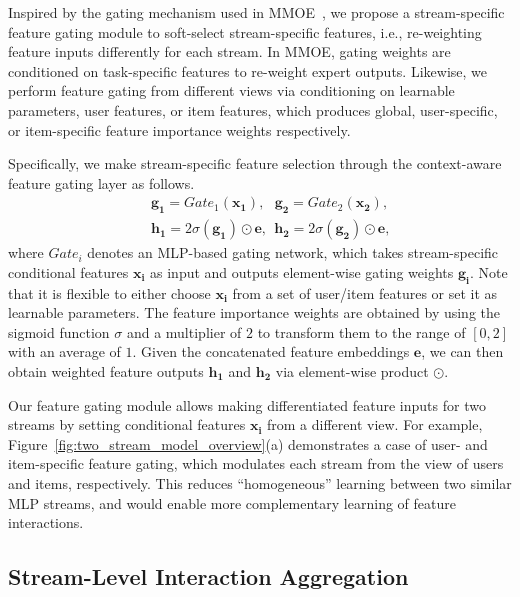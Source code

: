 \documentclass[letterpaper]{article} \usepackage{aaai23}  \usepackage{times}  \usepackage{helvet}  \usepackage{courier}  \usepackage[hyphens]{url}  \usepackage{graphicx} \urlstyle{rm} \def\UrlFont{\rm}  \usepackage{natbib}  \usepackage{caption} \frenchspacing  \setlength{\pdfpagewidth}{8.5in}  \setlength{\pdfpageheight}{11in}  \usepackage{algorithm}
\begin{document}
Inspired by the gating mechanism used in MMOE~\cite{MMoE}, we propose a stream-specific feature gating module to soft-select stream-specific features, i.e., re-weighting feature inputs differently for each stream. In MMOE, gating weights are conditioned on task-specific features to re-weight expert outputs. Likewise, we perform feature gating from different views via conditioning on learnable parameters, user features, or item features, which produces global, user-specific, or item-specific feature importance weights respectively. 



Specifically, we make stream-specific feature selection through the context-aware feature gating layer as follows.
\begin{eqnarray}
&&\mathbf{g_1} = {Gate}_{1}(\mathbf{x_1}),~~~\mathbf{g_2} = {Gate}_{2}(\mathbf{x_2}), \\
&&\mathbf{h_1} = 2\sigma (\mathbf{g_1})\odot \mathbf{e},~~\mathbf{h_2} = 2\sigma(\mathbf{g_2})\odot\mathbf{e},
\end{eqnarray}
where ${Gate}_{i}$ denotes an MLP-based gating network, which takes stream-specific conditional features $\mathbf{x_i}$ as input and outputs element-wise gating weights $\mathbf{g_i}$. Note that it is flexible to either choose $\mathbf{x_i}$ from a set of user/item features or set it as learnable parameters. The feature importance weights are obtained by using the sigmoid function $\sigma$ and a multiplier of $2$ to transform them to the range of $[0,2]$ with an average of $1$. Given the concatenated feature embeddings $\mathbf{e}$, we can then obtain weighted feature outputs $\mathbf{h_1}$ and $\mathbf{h_2}$ via element-wise product $\odot$. 

Our feature gating module allows making differentiated feature inputs for two streams by setting conditional features $\mathbf{x_i}$ from a different view. For example, Figure~\ref{fig:two_stream_model_overview}(a) demonstrates a case of user- and item-specific feature gating, which modulates each stream from the view of users and items, respectively. This reduces ``homogeneous'' learning between two similar MLP streams, and would enable more complementary learning of feature interactions.


\subsection{Stream-Level Interaction Aggregation}
\end{document}
